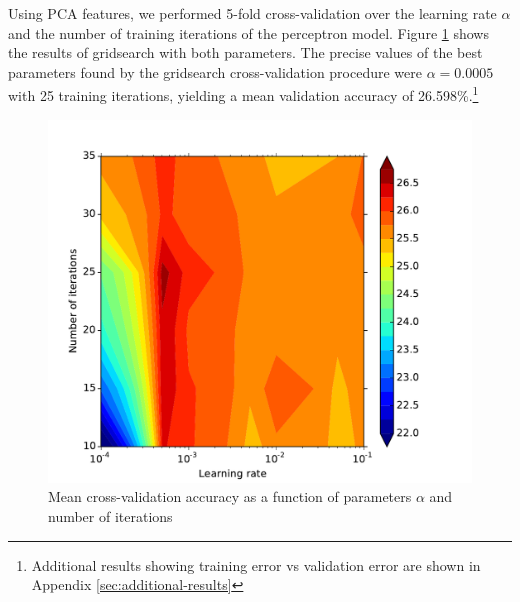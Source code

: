 \documentclass{acm_proc_article-sp}
\begin{document}
Using PCA features, we performed 5-fold cross-validation over the learning rate $\alpha$ and the number of training iterations of the perceptron model. Figure \ref{fig:perc-gridsearch} shows the results of gridsearch with both parameters. The precise values of the best parameters found by the gridsearch cross-validation procedure were $\alpha = 0.0005$ with 25 training iterations, yielding a mean validation accuracy of 26.598\%.\footnote{Additional results showing training error vs validation error are shown in Appendix \ref{sec:additional-results}}
\begin{figure}[h!]
	\centering
	\includegraphics[width=\linewidth]{perceptron_gridsearch}
  	\caption{Mean cross-validation accuracy as a function of parameters $\alpha$ and number of iterations}
  	\label{fig:perc-gridsearch}
\end{figure}
\end{document}
